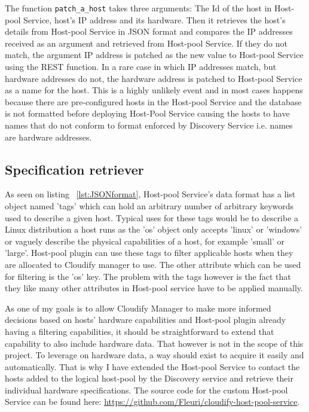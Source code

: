 The function \verb|patch_a_host| takes three arguments: The Id of the host in Host-pool Service, host's IP address and its hardware. Then it retrieves the host's details from Host-pool Service in JSON format and compares the IP addresses received as an argument and retrieved from Host-pool Service. If they do not match, the argument IP address is patched as the new value to Host-pool Service using the REST function. In a rare case in which IP addresses match, but hardware addresses do not, the hardware address is patched to Host-pool Service as a name for the host. This is a highly unlikely event and in most cases happens because there are pre-configured hosts in the Host-pool Service and the database is not formatted before deploying Host-Pool Service causing the hosts to have names that do not conform to format enforced by Discovery Service i.e. names are hardware addresses.

\subsection{Specification retriever}

As seen on listing ~\ref{lst:JSONformat}, Host-pool Service's data format has a list object named 'tags' which can hold an arbitrary number of arbitrary keywords used to describe a given host. Typical uses for these tags would be to describe a Linux distribution a host runs as the 'os' object only accepts 'linux' or 'windows' or vaguely describe the physical capabilities of a host, for example 'small' or 'large'. Host-pool plugin can use these tags to filter applicable hosts when they are allocated to Cloudify manager to use. The other attribute which can be used for filtering is the 'os' key. The problem with the tags however is the fact that they like many other attributes in Host-pool service have to be applied manually.

As one of my goals is to allow Cloudify Manager to make more informed decisions based on hosts' hardware capabilities and Host-pool plugin already having a filtering capabilities, it should be straightforward to extend that capability to also include hardware data. That however is not in the scope of this project. To leverage on hardware data, a way should exist to acquire it easily and automatically. That is why I have extended the Host-pool Service to contact the hosts added to the logical host-pool by the Discovery service and retrieve their individual hardware specifications. The source code for the custom Host-pool Service can be found here: \url{https://github.com/Fleuri/cloudify-host-pool-service}.

